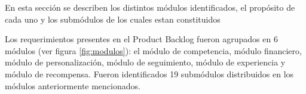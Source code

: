 
 En esta sección se describen los distintos módulos identificados, el propósito de cada uno
 y los submódulos de los cuales estan constituidos

    Los requerimientos presentes en el Product Backlog fueron agrupados en 6 módulos (ver figura \ref{fig:modulos}): el módulo de competencia, módulo financiero, módulo de personalización, módulo de seguimiento, módulo de experiencia y módulo de recompensa. Fueron identificados 19 submódulos distribuidos en los módulos anteriormente mencionados.\\

 
